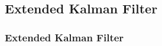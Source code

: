 \documentclass[letterpaper,10pt,english]{sphinxmanual}
\begin{document}
\subsection{Extended Kalman Filter}
\label{\detokenize{Filters:extended-kalman-filter}}
\sphinxstepscope


\subsubsection{Extended Kalman  Filter}
\label{\detokenize{EKF:extended-kalman-filter}}\label{\detokenize{EKF::doc}}
\begin{figure}[htbp]
\centering

\noindent{}
\end{figure}
\end{document}
